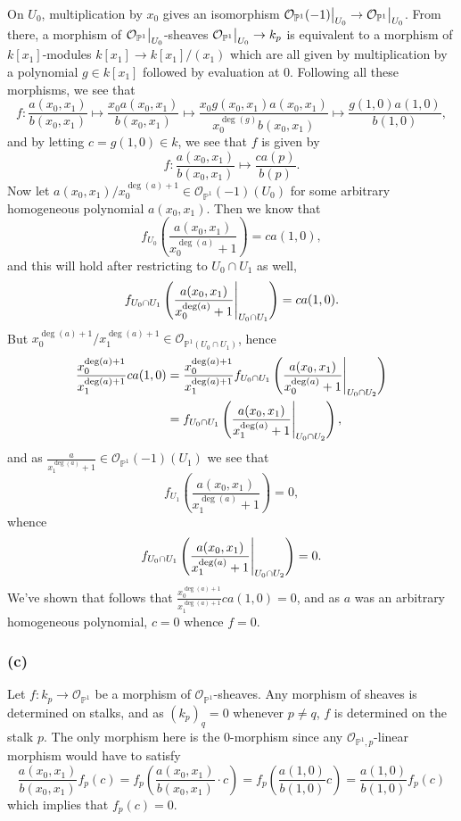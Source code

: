\documentclass{article}
\newcommand\restr[2]{{%
  \left.\kern-\nulldelimiterspace %
  #1 %
  \vphantom{\big|} %
  \right|_{#2} %
  }}
\theoremstyle{definition}
\renewcommand{\P}{\mathbb{P}}
\newcommand{\oo}{\mathcal{O}}
\begin{document}
On $U_0$, multiplication by $x_0$ gives an isomorphism
$\restr{\oo_{\P^{1}}(-1)}{U_0} \to \restr{\oo_{\P^{1}}}{U_0}$. From there, a
morphism of $\restr{\oo_{\P^{1}}}{U_0}$-sheaves $\restr{\oo_{\P^{1}}}{U_0} \to
k_p$ is equivalent to a morphism of $k[x_1]$-modules $k[x_1] \to k[x_1]/(x_1)$
which are all given by multiplication by a polynomial $g \in k[x_1]$ followed
by evaluation at $0$. Following all these morphisms, we see that 
\[
	f : \frac{a(x_0, x_1)}{b(x_0, x_1)}
	\mapsto 
	\frac{x_0 a(x_0, x_1)}{b(x_0, x_1)}
	\mapsto 
	\frac{x_0 g(x_0, x_1) a(x_0, x_1)}{x_0^{\deg(g)}b(x_0, x_1)}
	\mapsto 
	\frac{g(1, 0) a(1, 0)}{b(1, 0)},
\] 
and by letting $c = g(1, 0) \in k$, we see that $f$ is given by 
\[
	f : \frac{a(x_0, x_1)}{b(x_0, x_1)} \mapsto \frac{ca(p)}{b(p)}.
\] 
Now let $a(x_0, x_1)/x_0^{\deg(a) + 1} \in \oo_{\P^{1}}(-1)(U_0)$ for some
arbitrary homogeneous polynomial $a(x_0, x_1)$. Then we know that
\[
	f_{U_0}\left(\frac{a(x_0, x_1)}{x_0^{\deg(a)} + 1}\right) = ca(1,0),
\] 
and this will hold after restricting to $U_0 \cap U_1$ as well,
\[
f_{U_0 \cap U_1}\left(\restr{\frac{a(x_0, x_1)}{x_0^{\deg(a)} + 1}}{U_0 \cap U_1}\right) = ca(1,0).
\] 
But $x_0^{\deg(a) + 1}/x_1^{\deg(a) + 1} \in \oo_{\P^{1}(U_0 \cap U_1)}$,
hence 
\begin{align*}
	\frac{x_0^{\deg(a) + 1}}{x_1^{\deg(a) + 1}} ca(1, 0)
	&=
	\frac{x_0^{\deg(a) + 1}}{x_1^{\deg(a) + 1}} f_{U_0 \cap U_1}\left(
		\restr{\frac{a(x_0,x_1)}{x_0^{\deg(a)} + 1}}{U_0 \cap U_2}
	\right) \\
	&=
	f_{U_0 \cap U_1}\left(
		\restr{\frac{a(x_0,x_1)}{x_1^{\deg(a)} + 1}}{U_0 \cap U_2}
	\right),
\end{align*}
and as $\frac{a}{x_1^{\deg(a)} + 1} \in \oo_{\P^{1}}(-1)(U_1)$ we see that
\[
	f_{U_1}\left(\frac{a(x_0,x_1)}{x_1^{\deg(a)} + 1}\right) = 0,
\] 
whence
\[
	f_{U_0 \cap U_1}\left(
		\restr{\frac{a(x_0,x_1)}{x_1^{\deg(a)} + 1}}{U_0 \cap U_2}
	\right)
	=
	0.
\] 
We've shown that follows that $\frac{x_0^{\deg(a) + 1}}{x_1^{\deg(a) + 1}}
ca(1, 0) = 0$, and as $a$ was an arbitrary homogeneous polynomial, $c = 0$
whence $f = 0$.

\subsubsection*{(c)}

Let $f : k_p \to \oo_{\P^{1}}$ be a morphism of $\oo_{\P^{1}}$-sheaves. Any
morphism of sheaves is determined on stalks, and as $(k_p)_{q} = 0$ whenever $p
\not = q$, $f$ is determined on the stalk $p$. The only morphism here is the
$0$-morphism since any $\oo_{\P^{1}, p}$-linear morphism would have to satisfy
\[
	\frac{a(x_0, x_1)}{b(x_0,x_1)} f_p(c)
	=
	f_p\left(\frac{a(x_0, x_1)}{b(x_0,x_1)} \cdot c\right)
	=
	f_p\left(\frac{a(1, 0)}{b(1, 0)} c\right)
	=
	\frac{a(1, 0)}{b(1,0)} f_p(c)
\] 
which implies that $f_p(c) = 0$.
\end{document}
